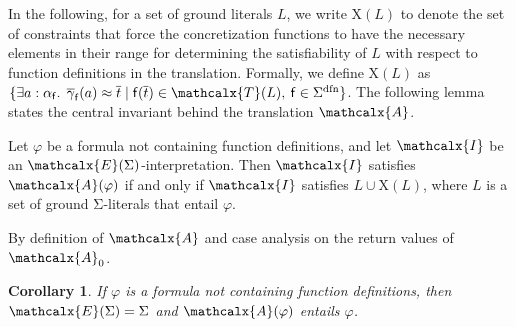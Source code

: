 \documentclass[runningheads,a4paper]{llncs}
\newcommand{\con}[1]{\mathsf{#1}}
\renewcommand\vec[1]{\overline{#1}}
\let\oldcup=\cup
\def\cup{\mathrel{\oldcup}}
\let\oldSigma=\Sigma
\def\Sigma{\mathrm{\oldSigma}}
\newcommand{\teq}{\approx}
\newcommand{\terms}{\mathcalx{T}}
\newcommand{\I}{\mathcalx{I}}
\newcommand{\conv}{\mathcalx{A}}
\newcommand{\sfundefs}[1]{#1^\mathrm{dfn}}
\newcommand\concret{\gamma} %
\newcommand{\vecfarg}[1]{\vec{\concret}_{#1}}
\newcommand{\fargtype}[1]{\alpha_{#1}}
\newcommand{\extendsig}[1]{\mathcalx{E}( #1 )}
\newcommand{\absconstraints}{\mathrm{X}}
\newtheorem{cor}{Corollary}
\begin{document}
In the following, for a set of ground literals $L$, 
we write $\absconstraints( L )$ to denote the set of constraints that
force the concretization functions to have the necessary elements in their
range for determining the satisfiability of $L$ with respect to function
definitions in the translation.
Formally, we define
$\absconstraints( L )$
as
$\{ \exists a : {\fargtype{\con{f}}}.\;\, \vecfarg{\con{f}}( a ) \teq \vec t
\mid \con{f}( \vec t ) \in \terms( L ),\: \con{f} \in \sfundefs{\Sigma}
\}$.
The following lemma states the central invariant behind the translation $\conv$.

\begin{lemma}\label{lem:conv}
Let $\varphi$ be a formula not containing function definitions,
and let $\I$ be an $\extendsig{\Sigma}$-interpretation.
Then $\I$ satisfies $\conv( \varphi )$ if and only if
$\I$ satisfies $L \cup \absconstraints( L )$, where $L$ is a set of ground $\Sigma$-literals that entail $\varphi$.
\end{lemma}
\begin{proofsketch}
By definition of $\conv$ and case analysis on the return values of $\conv_0$.
\end{proofsketch}

\begin{cor}\label{cor:conv}
If $\varphi$ is a formula not containing function definitions, then $\extendsig{\Sigma} = \Sigma$
and $\conv( \varphi )$ entails $\varphi$.
\end{cor}
\end{document}
